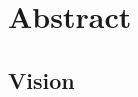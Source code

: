 \documentclass[12pt, a4paper]{article}
\begin{document}

		

\section*{Abstract}

\subsection*{Vision}
\end{document}
